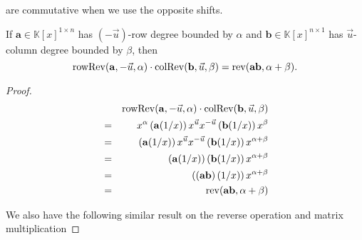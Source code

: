 are commutative when we use the opposite shifts.
\begin{lem}
\label{lem:reverseProduct}If $\mathbf{a}\in\mathbb{K}\left[x\right]^{1\times n}$
has $\left(-\vec{u}\right)$-row degree bounded by $\alpha$ and $\mathbf{b}\in\mathbb{K}\left[x\right]^{n\times1}$
has $\vec{u}$-column degree bounded by $\beta$, then 
\[
\operatorname{rowRev}(\mathbf{a},-\vec{u},\alpha)\cdot\operatorname{colRev}(\mathbf{b},\vec{u},\beta)=\operatorname{rev}(\mathbf{a}\mathbf{b},\alpha+\beta).
\]
\end{lem}
\begin{proof}
\ 
\begin{eqnarray*}
 &  & \operatorname{rowRev}(\mathbf{a},-\vec{u},\alpha)\cdot\operatorname{colRev}(\mathbf{b},\vec{u},\beta)\\
 & = & x^{\alpha}\left(\mathbf{a}(1/x)\right)x^{\vec{u}}x^{-\vec{u}}\left(\mathbf{b}(1/x)\right)x^{\beta}\\
 & = & \left(\mathbf{a}(1/x)\right)x^{\vec{u}}x^{-\vec{u}}\left(\mathbf{b}(1/x)\right)x^{\alpha+\beta}\\
 & = & \left(\mathbf{a}(1/x)\right)\left(\mathbf{b}(1/x)\right)x^{\alpha+\beta}\\
 & = & \left(\left(\mathbf{a}\mathbf{b}\right)(1/x)\right)x^{\alpha+\beta}\\
 & = & \operatorname{rev}(\mathbf{a}\mathbf{b},\alpha+\beta)
\end{eqnarray*}
\begin{comment}
\begin{lem}
If $\mathbf{F}\in\mathbb{K}\left[x\right]^{m\times n}$ has $\left(-\vec{s}\right)$-row
degree bounded component-wise by $\vec{a}=\left[a_{1},\dots,a_{m}\right]$
and $\mathbf{G}\in\mathbb{K}\left[x\right]^{n\times k}$ has $\vec{s}$-column
degree bounded component-wise by $\vec{b}=[b_{1},\dots,b_{m}]$, then
\[
\reverse(\mathbf{F},-\vec{s},\vec{a})\cdot\reverse(\mathbf{G},\vec{s},\vec{b})=\reverse(\mathbf{F}\mathbf{G},\vec{c}),
\]
 where 
\[
\vec{c}=\begin{bmatrix}a_{1}+b_{1} & a & \cdots & a_{1}+b_{k}\\
\\
\\
\end{bmatrix}\in\mathbb{Z}^{m\times k}
\]
\end{lem}
\begin{proof}
sd$\reverse(\mathbf{n},\vec{s},t)\cdot\reverse(\mathbf{g},\vec{s},b)$\end{proof}
\end{comment}


We also have the following similar result on the reverse operation
and matrix multiplication\end{proof}

